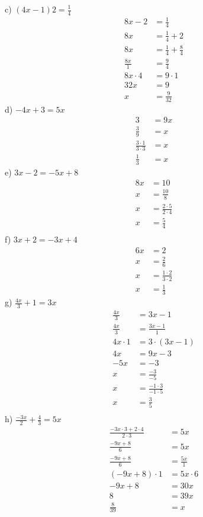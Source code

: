 \documentclass[12pt]{article}
\begin{document}
c) $(4x-1)2=\displaystyle \frac{1}{4}$
\begin{align*}
8x-2&=\displaystyle \frac{1}{4} \\
8x&=\displaystyle \frac{1}{4}+2 \\
8x&=\displaystyle \frac{1}{4}+\displaystyle \frac{8}{4} \\
\displaystyle \frac{8x}{1}&=\displaystyle \frac{9}{4} \\
8x\cdot4&=9\cdot1 \\
32x&=9\\
x&=\displaystyle \frac{9}{32}
\end{align*}
d) $-4x+3=5x$
\begin{align*}
3&=9x \\
\displaystyle \frac{3}{9}&=x \\
\displaystyle \frac{3\cdot1}{3\cdot3}&=x \\
\displaystyle \frac{1}{3}&=x
\end{align*}
e) $3x-2=-5x+8$
\begin{align*}
8x&=10 \\
x&=\displaystyle \frac{10}{8} \\
x&=\displaystyle \frac{2\cdot5}{2\cdot4} \\
x&=\displaystyle \frac{5}{4} \\
\end{align*}
f) $3x+2=-3x+4$
\begin{align*}
6x&=2 \\
x&=\displaystyle \frac{2}{6} \\
x&=\displaystyle \frac{1\cdot2}{3\cdot2} \\
x&=\displaystyle \frac{1}{3}
\end{align*}
g) $\displaystyle \frac{4x}{3}+1=3x$
\begin{align*}
\displaystyle \frac{4x}{3}&=3x-1 \\
\displaystyle \frac{4x}{3}&=\displaystyle \frac{3x-1}{1} \\
4x\cdot1&=3\cdot(3x-1) \\
4x&=9x-3 \\
-5x&=-3 \\
x&=\displaystyle \frac{-3}{-5} \\
x&=\displaystyle \frac{-1\cdot3}{-1\cdot5} \\
x&=\displaystyle \frac{3}{5} \\
\end{align*}
h) $\displaystyle \frac{-3x}{2}+\displaystyle \frac{4}{3}=5x$
\begin{align*}
\displaystyle \frac{-3x\cdot3+2\cdot4}{2\cdot3}&=5x \\
\displaystyle \frac{-9x+8}{6}&=5x \\
\displaystyle \frac{-9x+8}{6}&=\displaystyle \frac{5x}{1} \\
(-9x+8)\cdot1&=5x\cdot6 \\
-9x+8&=30x \\
8&=39x \\
\displaystyle \frac{8}{39}&=x
\end{align*}
\end{document}
